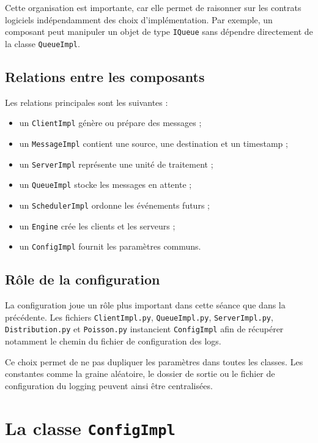 \documentclass{article}
\begin{document}
Cette organisation est importante, car elle permet de raisonner sur les contrats logiciels indépendamment des choix d’implémentation. Par exemple, un composant peut manipuler un objet de type \texttt{IQueue} sans dépendre directement de la classe \texttt{QueueImpl}.

\subsection{Relations entre les composants}

Les relations principales sont les suivantes :
\begin{itemize}[leftmargin=*]
    \item un \texttt{ClientImpl} génère ou prépare des messages ;
    \item un \texttt{MessageImpl} contient une source, une destination et un timestamp ;
    \item un \texttt{ServerImpl} représente une unité de traitement ;
    \item un \texttt{QueueImpl} stocke les messages en attente ;
    \item un \texttt{SchedulerImpl} ordonne les événements futurs ;
    \item un \texttt{Engine} crée les clients et les serveurs ;
    \item un \texttt{ConfigImpl} fournit les paramètres communs.
\end{itemize}

\subsection{Rôle de la configuration}

La configuration joue un rôle plus important dans cette séance que dans la précédente. Les fichiers \texttt{ClientImpl.py}, \texttt{QueueImpl.py}, \texttt{ServerImpl.py}, \texttt{Distribution.py} et \texttt{Poisson.py} instancient \texttt{ConfigImpl} afin de récupérer notamment le chemin du fichier de configuration des logs.

Ce choix permet de ne pas dupliquer les paramètres dans toutes les classes. Les constantes comme la graine aléatoire, le dossier de sortie ou le fichier de configuration du logging peuvent ainsi être centralisées.

\section{La classe \texttt{ConfigImpl}}
\end{document}

